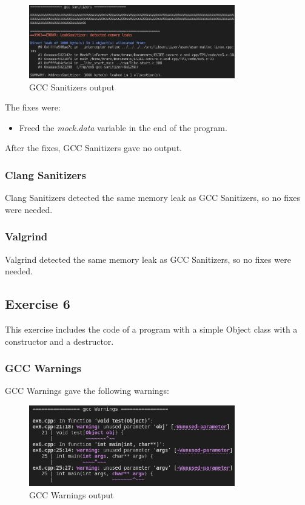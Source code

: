 \documentclass{article}
\begin{document}
\begin{figure}[ht!]
    \centering
    \includegraphics[width=0.8\textwidth]{images/ex5/gccSanitizers.png}
    \caption{GCC Sanitizers output}\label{fig:ex5/gccSanitizers}
\end{figure}

The fixes were:

\begin{itemize}
    \item Freed the \textit{mock.data} variable in the end of the program.
\end{itemize}

After the fixes, GCC Sanitizers gave no output.

\subsubsection{Clang Sanitizers}

Clang Sanitizers detected the same memory leak as GCC Sanitizers, so no fixes were needed.

\subsubsection{Valgrind}

Valgrind detected the same memory leak as GCC Sanitizers, so no fixes were needed.

\subsection{Exercise 6}

This exercise includes the code of a program with a simple Object class with a constructor and a destructor.

\subsubsection{GCC Warnings}

GCC Warnings gave the following warnings:

\begin{figure}[ht!]
    \centering
    \includegraphics[width=0.8\textwidth]{images/ex6/gccWarnings.png}
    \caption{GCC Warnings output}\label{fig:ex6/gccWarnings}
\end{figure}
\end{document}
